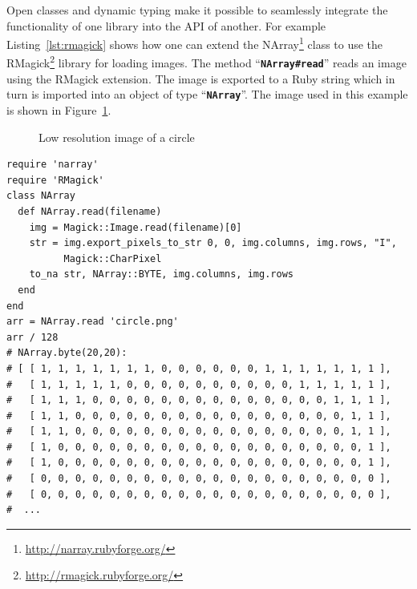 \documentclass[12pt,a4paper,oneside,openright]{book}
\newcommand{\Eg}{For example }
\newcommand{\fig}[1]{Figure~\ref{fig:#1}}
\newcommand{\lst}[1]{Listing~\ref{lst:#1}}
\newcommand{\code}[1]{``\texttt{\textbf{\textcolor{codegray}{\small{#1}}}}''}
\newcommand{\rubyout}{Comment lines (preceded with ``\#'') show the output of the program}
\begin{document}
\begin{CJK}{UTF8}{}
Open classes and dynamic typing make it possible to seamlessly integrate the functionality of one library into the \ac{API} of another. \Eg \lst{rmagick} shows how one can extend the NArray\footnote{\url{http://narray.rubyforge.org/}} class to use the RMagick\footnote{\url{http://rmagick.rubyforge.org/}} library for loading images. The method \code{NArray\#read} reads an image using the RMagick extension. The image is exported to a Ruby string which in turn is imported into an object of type \code{NArray}. The image used in this example is shown in \fig{circle}.
\begin{figure}[htbp]
  \begin{center}
    \caption{Low resolution image of a circle\label{fig:circle}}
  \end{center}
\end{figure}
\lstset{language=Ruby,frame=single,numbers=none}
\begin{lstlisting}[float=htbp,caption={Integrating RMagick and NArray in Ruby. \rubyout},label=lst:rmagick]
require 'narray'
require 'RMagick'
class NArray
  def NArray.read(filename)
    img = Magick::Image.read(filename)[0]
    str = img.export_pixels_to_str 0, 0, img.columns, img.rows, "I",
          Magick::CharPixel
    to_na str, NArray::BYTE, img.columns, img.rows
  end
end
arr = NArray.read 'circle.png'
arr / 128
# NArray.byte(20,20):
# [ [ 1, 1, 1, 1, 1, 1, 1, 0, 0, 0, 0, 0, 0, 1, 1, 1, 1, 1, 1, 1 ],
#   [ 1, 1, 1, 1, 1, 0, 0, 0, 0, 0, 0, 0, 0, 0, 0, 1, 1, 1, 1, 1 ],
#   [ 1, 1, 1, 0, 0, 0, 0, 0, 0, 0, 0, 0, 0, 0, 0, 0, 0, 1, 1, 1 ],
#   [ 1, 1, 0, 0, 0, 0, 0, 0, 0, 0, 0, 0, 0, 0, 0, 0, 0, 0, 1, 1 ],
#   [ 1, 1, 0, 0, 0, 0, 0, 0, 0, 0, 0, 0, 0, 0, 0, 0, 0, 0, 1, 1 ],
#   [ 1, 0, 0, 0, 0, 0, 0, 0, 0, 0, 0, 0, 0, 0, 0, 0, 0, 0, 0, 1 ],
#   [ 1, 0, 0, 0, 0, 0, 0, 0, 0, 0, 0, 0, 0, 0, 0, 0, 0, 0, 0, 1 ],
#   [ 0, 0, 0, 0, 0, 0, 0, 0, 0, 0, 0, 0, 0, 0, 0, 0, 0, 0, 0, 0 ],
#   [ 0, 0, 0, 0, 0, 0, 0, 0, 0, 0, 0, 0, 0, 0, 0, 0, 0, 0, 0, 0 ],
#  ...
\end{lstlisting}


\end{CJK}
\end{document}

